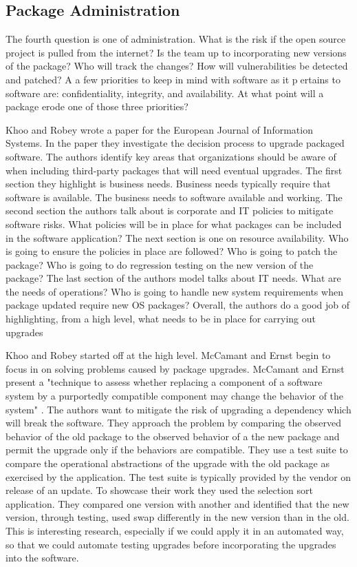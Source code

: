 \documentclass[journal]{IEEEtran}
\begin{document}
\subsection{Package Administration}
The fourth question is one of administration. What is the risk if the open source project is pulled from the internet? Is the team up to incorporating new versions of the package? Who will track the changes? How will vulnerabilities be detected and patched? A a few priorities to keep in mind with software as it pertains to software are: confidentiality, integrity, and availability. At what point will a package erode one of those three priorities? 

Khoo and Robey wrote a paper for the European Journal of Information Systems. In the paper they investigate the decision process to upgrade packaged software. The authors identify key areas that organizations should be aware of when including third-party packages that will need eventual upgrades. The first section they highlight is business needs. Business needs typically require that software is available. The business needs to software available and working. The second section the authors talk about is corporate and IT policies to mitigate software risks. What policies will be in place for what packages can be included in the software application? The next section is one on resource availability. Who is going to ensure the policies in place are followed? Who is going to patch the package? Who is going to do regression testing on the new version of the package? The last section of the authors model talks about IT needs. What are the needs of operations? Who is going to handle new system requirements when package updated require new OS packages? Overall, the authors do a good job of highlighting, from a high level, what needs to be in place for carrying out upgrades \cite{Min}

Khoo and Robey started off at the high level. McCamant and Ernst begin to focus in on solving problems caused by package upgrades. McCamant and Ernst present a "technique to assess whether replacing a component of a software system by a purportedly compatible component may change the behavior of the system" \cite{McCamant_Ernst_McCamant_Ernst_2003}. The authors want to mitigate the risk of upgrading a dependency which will break the software. They approach the problem by comparing the observed behavior of the old package to the observed behavior of a the new package and permit the upgrade only if the behaviors are compatible. They use a test suite to compare the operational abstractions of the upgrade with the old package as exercised by the application. The test suite is typically provided by the vendor on release of an update. To showcase their work they used the selection sort application. They compared one version with another and identified that the new version, through testing, used swap differently in the new version than in the old. This is interesting research, especially if we could apply it in an automated way, so that we could automate testing upgrades before incorporating the upgrades into the software.
\end{document}
